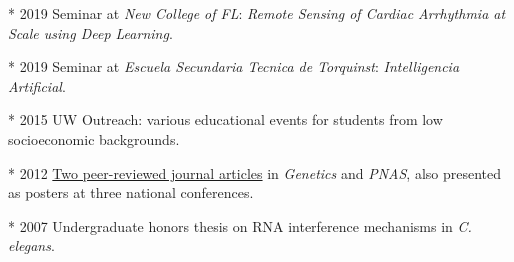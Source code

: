 \documentclass[a4paper,12pt]{article}
\newcommand{\resheading}[1]{{\hspace{-9pt} \colorbox{mygrey}{\begin{minipage}{\textwidth}{\textmd{~~\large \textbf{#1} \vphantom{p\^{E}}}}\end{minipage}}\vspace{6pt}} }
\newcommand{\ressubheading}[4]{{\begin{minipage}{\textwidth}
                                    \textbf{#1} \hfill #2 \\
                                    \textit{#3} \hfill #4 \\
\end{minipage}}}
\begin{document}
    * 2019 Seminar at \textit{New College of FL}: \textit{Remote Sensing of Cardiac Arrhythmia at Scale using Deep Learning}.

    * 2019 Seminar at \textit{Escuela Secundaria Tecnica de Torquinst}: \textit{Intelligencia Artificial}.


    * 2015 UW Outreach: various educational events for students from low socioeconomic backgrounds.

    * 2012 \href{https://scholar.google.co.nz/citations?user=4ODJ78oAAAAJ&hl=en}{Two peer-reviewed journal articles} in \textit{Genetics} and \textit{PNAS}, also presented as posters at three national conferences.

    * 2007 Undergraduate honors thesis on RNA interference mechanisms in \textit{C. elegans}.\\


\end{document}
